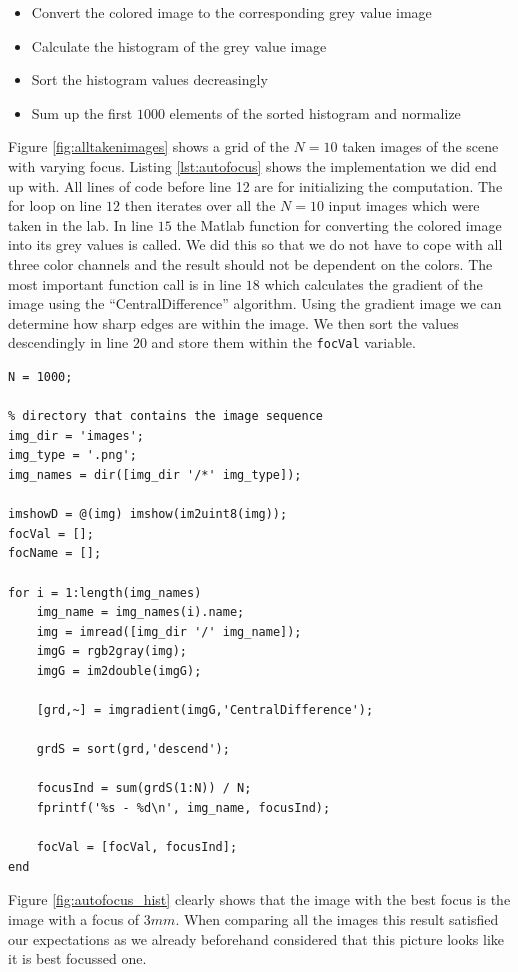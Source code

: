 \documentclass[
a4paper,     %
12pt         %
]{scrartcl}  %
\begin{document}
\begin{itemize}
 \item Convert the colored image to the corresponding grey value image
 \item Calculate the histogram of the grey value image
 \item Sort the histogram values decreasingly
 \item Sum up the first $1000$ elements of the sorted histogram and normalize
\end{itemize}

Figure \ref{fig:alltakenimages} shows a grid of the $N=10$ taken images of the scene with varying focus.
Listing \ref{lst:autofocus} shows the implementation we did end up with.
All lines of code before line 12 are for initializing the computation.
The for loop on line $12$ then iterates over all the $N=10$ input images which were taken in the lab.
In line $15$ the Matlab function for converting the colored image into its grey values is called.
We did this so that we do not have to cope with all three color channels and the result should not be dependent on the colors.
The most important function call is in line $18$ which calculates the gradient of the image using the ``CentralDifference'' algorithm.
Using the gradient image we can determine how sharp edges are within the image.
We then sort the values descendingly in line $20$ and store them within the \lstinline{focVal} variable.

\begin{lstlisting}[label=lst:autofocus, caption=Matlab script for calculating best focus value]
N = 1000;

% directory that contains the image sequence
img_dir = 'images';
img_type = '.png';
img_names = dir([img_dir '/*' img_type]);

imshowD = @(img) imshow(im2uint8(img));
focVal = [];
focName = [];

for i = 1:length(img_names)
    img_name = img_names(i).name;
    img = imread([img_dir '/' img_name]);
    imgG = rgb2gray(img);
    imgG = im2double(imgG);
    
    [grd,~] = imgradient(imgG,'CentralDifference');
    
    grdS = sort(grd,'descend');
    
    focusInd = sum(grdS(1:N)) / N;
    fprintf('%s - %d\n', img_name, focusInd);
    
    focVal = [focVal, focusInd];
end
\end{lstlisting}

Figure \ref{fig:autofocus_hist} clearly shows that the image with the best focus is the image with a focus of $3mm$.
When comparing all the images this result satisfied our expectations as we already beforehand considered that this picture looks like it is best focussed one.
\end{document}
